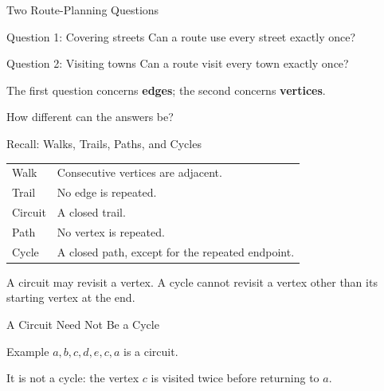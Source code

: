 \documentclass[aspectratio=169,11pt]{beamer}
\begin{document}
\begin{frame}{Two Route-Planning Questions}
\large
\begin{block}{Question 1: Covering streets}
Can a route use every street exactly once?
\end{block}
\begin{block}{Question 2: Visiting towns}
Can a route visit every town exactly once?
\end{block}
\bigskip The first question concerns \textbf{edges}; the second concerns \textbf{vertices}.\par\medskip How different can the answers be?
\end{frame}

\begin{frame}{Recall: Walks, Trails, Paths, and Cycles}
\large
\renewcommand{\arraystretch}{1.5}\begin{tabular}{ll}\toprule Walk & Consecutive vertices are adjacent.\\Trail & No edge is repeated.\\Circuit & A closed trail.\\Path & No vertex is repeated.\\Cycle & A closed path, except for the repeated endpoint.\\\bottomrule\end{tabular}\par\bigskip A circuit may revisit a vertex. A cycle cannot revisit a vertex other than its starting vertex at the end.
\end{frame}

\begin{frame}{A Circuit Need Not Be a Cycle}
\large
\begin{center}\end{center}\begin{block}{Example}
$a,b,c,d,e,c,a$ is a circuit.\par\smallskip It is not a cycle: the vertex $c$ is visited twice before returning to $a$.
\end{block}

\end{frame}
\end{document}
